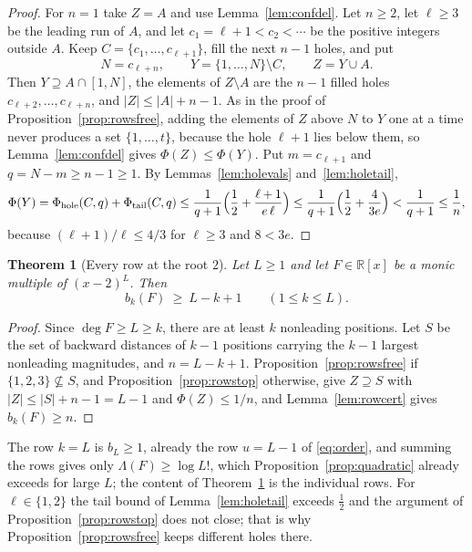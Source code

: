 \documentclass[11pt]{article}
\newtheorem{theorem}{Theorem}[section]
\newcommand{\R}{\mathbb R}
\begin{document}
\begin{proof}
For $n=1$ take $Z=A$ and use Lemma~\ref{lem:confdel}.  Let $n\ge2$, let
$\ell\ge3$ be the leading run of $A$, and let $c_1=\ell+1<c_2<\cdots$ be the
positive integers outside $A$.  Keep $C=\{c_1,\ldots,c_{\ell+1}\}$, fill the
next $n-1$ holes, and put
\[
  N=c_{\ell+n},\qquad Y=\{1,\ldots,N\}\setminus C,\qquad Z=Y\cup A .
\]
Then $Y\supseteq A\cap[1,N]$, the elements of $Z\setminus A$ are the $n-1$
filled holes $c_{\ell+2},\ldots,c_{\ell+n}$, and $|Z|\le|A|+n-1$.  As in the proof
of Proposition~\ref{prop:rowsfree}, adding the elements of $Z$ above $N$ to
$Y$ one at a time never produces a set $\{1,\ldots,t\}$, because the hole
$\ell+1$ lies below them, so Lemma~\ref{lem:confdel} gives
$\Phi(Z)\le\Phi(Y)$.  Put $m=c_{\ell+1}$ and $q=N-m\ge n-1\ge1$.  By
Lemmas~\ref{lem:holevals} and~\ref{lem:holetail},
\[
  \Phi(Y)=\Phi_{\mathrm{hole}}(C,q)+\Phi_{\mathrm{tail}}(C,q)\le\frac1{q+1}\Bigl(\frac12+\frac{\ell+1}{e\,\ell}\Bigr)
  \le\frac1{q+1}\Bigl(\frac12+\frac4{3e}\Bigr)<\frac1{q+1}\le\frac1n,
\]
because $(\ell+1)/\ell\le4/3$ for $\ell\ge3$ and $8<3e$.
\end{proof}

\begin{theorem}[Every row at the root $2$]\label{thm:everyrow}
Let $L\ge1$ and let $F\in\R[x]$ be a monic multiple of $(x-2)^L$.  Then
\[
  b_k(F)\ \ge\ L-k+1\qquad(1\le k\le L).
\]
\end{theorem}

\begin{proof}
Since $\deg F\ge L\ge k$, there are at least $k$ nonleading positions.  Let
$S$ be the set of backward distances of $k-1$ positions carrying the $k-1$
largest nonleading magnitudes, and $n=L-k+1$.  Proposition~\ref{prop:rowsfree}
if $\{1,2,3\}\not\subseteq S$, and Proposition~\ref{prop:rowstop} otherwise,
give $Z\supseteq S$ with $|Z|\le|S|+n-1=L-1$ and $\Phi(Z)\le1/n$, and
Lemma~\ref{lem:rowcert} gives $b_k(F)\ge n$.
\end{proof}

The row $k=L$ is $b_L\ge1$, already the row $u=L-1$ of \eqref{eq:order}, and summing the rows gives only
$\Lambda(F)\ge\log L!$, which Proposition~\ref{prop:quadratic} already
exceeds for large $L$; the content of Theorem~\ref{thm:everyrow} is the
individual rows.  For $\ell\in\{1,2\}$ the tail bound of Lemma~\ref{lem:holetail}
exceeds $\frac12$ and the argument of Proposition~\ref{prop:rowstop} does
not close; that is why Proposition~\ref{prop:rowsfree} keeps different
holes there.
\end{document}
